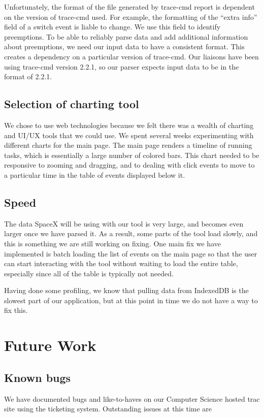 \documentclass{hmcclinic}
\begin{document}
  Unfortunately, the format of the file generated by trace-cmd report is
  dependent on the version of trace-cmd used. For example, the formatting of the
  ``extra info'' field of a switch event is liable to change. We use this
  field to identify preemptions. To be able to reliably parse data and add
  additional information about preemptions, we need our input data to have
  a consistent format. This creates a dependency on a particular version
  of trace-cmd. Our liaisons have been using trace-cmd version 2.2.1, so
  our parser expects input data to be in the format of 2.2.1.
\section{Selection of charting tool} %
  We chose to use web technologies because we felt there was a wealth of
  charting and UI/UX tools that we could use. We spent several weeks
  experimenting with different charts for the main page. The main page renders a
  timeline of running tasks, which is essentially a large number of colored
  bars. This chart needed to be responsive to zooming and dragging, and to
  dealing with click events to move to a particular time in the table of events
  displayed below it.
\section{Speed} %
The data SpaceX will be using with our tool is very large, and becomes even
larger once we have parsed it. As a result, some parts of the tool load slowly,
and this is something we are still working on fixing. One main fix we have
implemented is batch loading the list of events on the main page so that the
user can start interacting with the tool without waiting to load the entire
table, especially since all of the table is typically not needed.

Having done some profiling, we know that pulling data from IndexedDB is the
slowest part of our application, but at this point in time we do not have a way
to fix this.

\chapter{Future Work}
\section{Known bugs}

  We have documented bugs and like-to-haves on our Computer Science hosted trac
  site using the ticketing system. Outstanding issues at this time are
\end{document}
